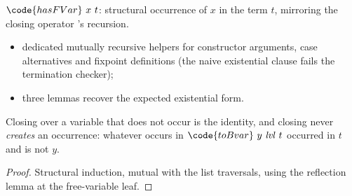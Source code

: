 \begin{definition}
\label{def:hasFVar}
\leanok
{}
 $\code{hasFVar}\ x\ t$: structural occurrence of $x$ in the \lbox{} term $t$, mirroring the closing operator 's recursion.
\begin{itemize}
\item dedicated mutually recursive helpers for constructor arguments, case alternatives and fixpoint definitions (the naive existential clause fails the termination checker);
\item three  lemmas recover the expected existential form.
\end{itemize}
\end{definition}

\begin{lemma}
\label{lem:toBvar_eq_of_not_hasFVar}
\leanok
{}
 Closing over a variable that does not occur is the identity, and closing never \emph{creates} an occurrence: whatever occurs in $\code{toBvar}\ y\ \mathit{lvl}\ t$ occurred in $t$ and is not $y$.
\end{lemma}
\begin{proof}
\leanok
{}
 Structural induction, mutual with the list traversals, using the reflection lemma at the free-variable leaf.
\end{proof}

